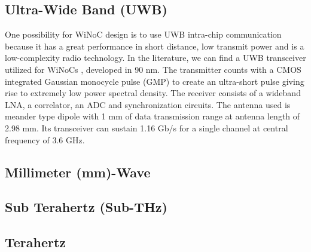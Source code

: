 \documentclass[12pt]{article}
\begin{document}
\subsection{Ultra-Wide Band (UWB)}

One possibility for WiNoC design is to use UWB intra-chip communication because it has a great performance in short distance, low transmit power and is a low-complexity radio technology. In the literature, we can find a UWB transceiver utilized for WiNoCs \citep {4531729} , developed in 90 nm. The transmitter counts with a CMOS integrated Gaussian monocycle pulse (GMP) to create an ultra-short pulse giving rise to extremely low power spectral density. The receiver consists of a wideband LNA, a correlator, an ADC and synchronization circuits. The antenna used is meander type dipole with 1 mm of data transmission range at antenna length of 2.98 mm. Its transceiver can sustain 1.16 Gb/s for a single channel at central frequency of 3.6 GHz. 


\subsection{Millimeter (mm)-Wave}
\subsection{Sub Terahertz (Sub-THz)}
\subsection{Terahertz}
\end{document}
